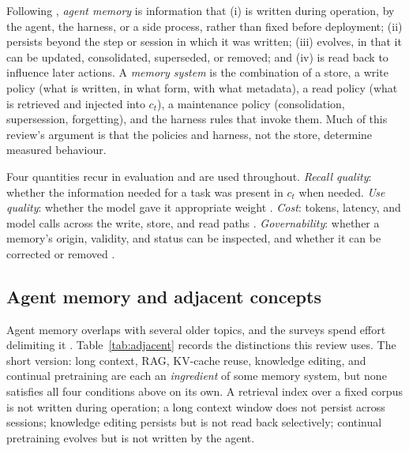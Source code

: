 \documentclass[11pt]{article}
\begin{document}
Following \citet{hu2025memoryage}, \emph{agent memory} is information that (i) is written during operation, by the agent, the harness, or a side process, rather than fixed before deployment; (ii) persists beyond the step or session in which it was written; (iii) evolves, in that it can be updated, consolidated, superseded, or removed; and (iv) is read back to influence later actions. A \emph{memory system} is the combination of a store, a write policy (what is written, in what form, with what metadata), a read policy (what is retrieved and injected into $c_t$), a maintenance policy (consolidation, supersession, forgetting), and the harness rules that invoke them. Much of this review's argument is that the policies and harness, not the store, determine measured behaviour.

Four quantities recur in evaluation and are used throughout. \emph{Recall quality}: whether the information needed for a task was present in $c_t$ when needed. \emph{Use quality}: whether the model gave it appropriate weight \citep{cao2026memcalib}. \emph{Cost}: tokens, latency, and model calls across the write, store, and read paths \citep{omri2026systems}. \emph{Governability}: whether a memory's origin, validity, and status can be inspected, and whether it can be corrected or removed \citep{lin2026security}.

\subsection{Agent memory and adjacent concepts}

Agent memory overlaps with several older topics, and the surveys spend effort delimiting it \citep{hu2025memoryage,du2025rethinking}. Table~\ref{tab:adjacent} records the distinctions this review uses. The short version: long context, RAG, KV-cache reuse, knowledge editing, and continual pretraining are each an \emph{ingredient} of some memory system, but none satisfies all four conditions above on its own. A retrieval index over a fixed corpus is not written during operation; a long context window does not persist across sessions; knowledge editing persists but is not read back selectively; continual pretraining evolves but is not written by the agent.
\end{document}
